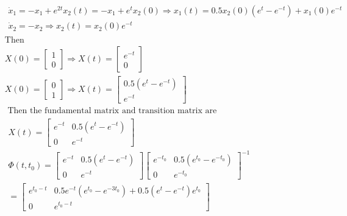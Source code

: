 \documentclass{article}
\begin{document}
$$
\begin{aligned}
&\begin{array}{l}
\dot{x}_{1}=-x_{1}+e^{2 t} x_{2}(t)=-x_{1}+e^{t} x_{2}(0) \Rightarrow
x_{1}(t)=0.5 x_{2}(0)\left(e^{t}-e^{-t}\right)+x_{1}(0) e^{-t} \\
\dot{x}_{2}=-x_{2} \Rightarrow x_{2}(t)=x_{2}(0) e^{-t}
\end{array}\\
&\text{Then}\\
&X(0)=\left[\begin{array}{l}
1 \\
0
\end{array}\right] \Rightarrow X(t)=\left[\begin{array}{c}
e^{-t} \\
0
\end{array}\right]\\
& X(0)=\left[\begin{array}{l}
0 \\
1
\end{array}\right] \Rightarrow X(t)=\left[\begin{array}{c}
0.5\left(e^{t}-e^{-t}\right) \\
e^{-t}
\end{array}\right]\\
&\text { Then the fundamental matrix and transition matrix are}\\
&\begin{array}{l}
X(t)=\left[\begin{array}{cc}
e^{-t} & 0.5\left(e^{t}-e^{-t}\right) \\
0 & e^{-t}
\end{array}\right] \\
\Phi\left(t, t_{0}\right)=\left[\begin{array}{cc}
e^{-t} & 0.5\left(e^{t}-e^{-t}\right) \\
0 & e^{-t}
\end{array}\right]\left[\begin{array}{cc}
e^{-t_{0}} & 0.5\left(e^{t_{0}}-e^{-t_{0}}\right) \\
0 & e^{-t_{0}}
\end{array}\right]^{-1} \\
=\left[\begin{array}{cc}
e^{t_{0}-t} & 0.5 e^{-t}\left(e^{t_{0}}-e^{-3 t_{0}}\right)+0.5\left(e^{t}-e^{-t}\right) e^{t_{0}} \\
0 & e^{t_{0}-t}
\end{array}\right]
\end{array}
\end{aligned}
$$
\end{document}
